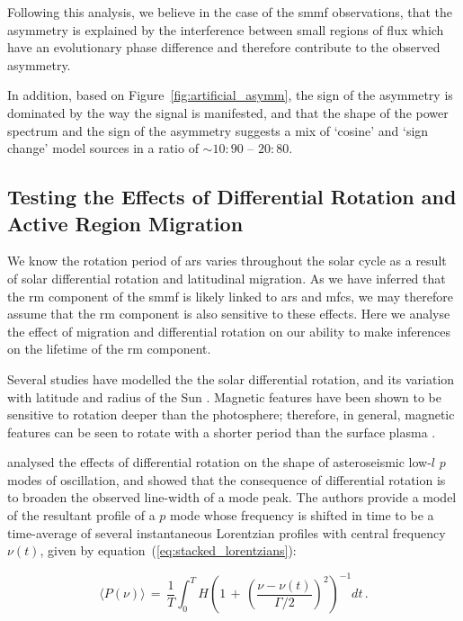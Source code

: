 Following this analysis, we believe in the case of the \gls{smmf} observations, that the asymmetry is explained by the interference between small regions of flux which have an evolutionary phase difference and therefore contribute to the observed asymmetry.

In addition, based on Figure~\ref{fig:artificial_asymm}, the sign of the asymmetry is dominated by the way the signal is manifested, and that the shape of the power spectrum and the sign of the asymmetry suggests a mix of `cosine' and `sign change' model sources in a ratio of $\sim 10:90$ -- $20:80$.


\subsection{Testing the Effects of Differential Rotation and Active Region Migration}
\label{sec:smearing}

We know the rotation period of \glspl{ar} varies throughout the solar cycle as a result of solar differential rotation and latitudinal migration. As we have inferred that the \gls{rm} component of the \gls{smmf} is likely linked to \glspl{ar} and \glspl{mfc}, we may therefore assume that the \gls{rm} component is also sensitive to these effects. Here we analyse the effect of migration and differential rotation on our ability to make inferences on the lifetime of the \gls{rm} component.

Several studies have modelled the the solar differential rotation, and its variation with latitude and radius of the Sun \citep[see][for an in depth review of the literature on solar differential rotation]{beck_comparison_2000, howe_solar_2009}. Magnetic features have been shown to be sensitive to rotation deeper than the photosphere; therefore, in general, magnetic features can be seen to rotate with a shorter period than the surface plasma \citep{howe_solar_2009}.

\citet{chaplin_distortion_2008} analysed the effects of differential rotation on the shape of asteroseismic low-$l$ $p$ modes of oscillation, and showed that the consequence of differential rotation is to broaden the observed line-width of a mode peak. The authors provide a model of the resultant profile of a $p$ mode whose frequency is shifted in time to be a time-average of several instantaneous Lorentzian profiles with central frequency $\nu(t)$, given by equation~(\ref{eq:stacked_lorentzians}):

\begin{equation}
\langle P(\nu) \rangle \, = \, \frac{1}{T} \int^T_0 H \left( 1 \, + \, \left( \frac{\nu - \nu(t)}{\Gamma /2} \right)^2 \right)^{-1} dt \, .
\label{eq:stacked_lorentzians}
\end{equation}


